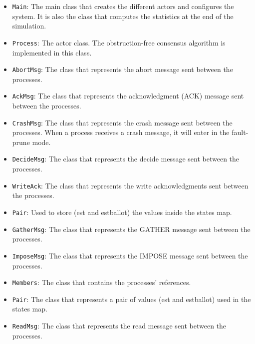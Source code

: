 \documentclass{article}
\begin{document}
\begin{itemize}
    \item \texttt{Main}: The main class that creates the different actors and configures the system. It is also the class that computes the statistics at the end of the simulation.

    \item \texttt{Process}: The actor class. The obstruction-free consensus algorithm is implemented in this class.

    \item \texttt{AbortMsg}: The class that represents the abort message sent between the processes.

    \item \texttt{AckMsg}: The class that represents the acknowledgment (ACK) message sent between the processes.

    \item \texttt{CrashMsg}: The class that represents the crash message sent between the processes. When a process receives a crash message, it will enter in the fault-prune mode.

    \item \texttt{DecideMsg}: The class that represents the decide message sent between the processes.

    \item \texttt{WriteAck}: The class that represents the write acknowledgments sent between the processes.

    \item \texttt{Pair}: Used to store (est and estballot) the values inside the states map.
    \item \texttt{GatherMsg}: The class that represents the GATHER message sent between the processes.
    
    \item \texttt{ImposeMsg}: The class that represents the IMPOSE message sent between the processes.
    
    \item \texttt{Members}: The class that contains the processes' references.
    
    \item \texttt{Pair}:  The class that represents a pair of values (est and estballot) used in the states map.
    
    \item \texttt{ReadMsg}: The class that represents the read message sent between the processes.
\end{itemize}
\end{document}
